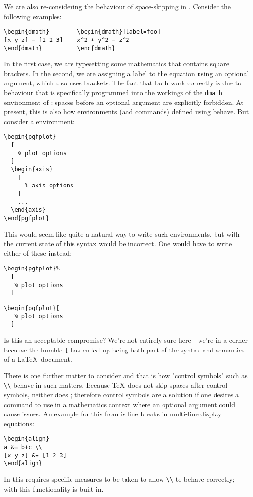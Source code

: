 \documentclass{ltnews}
\begin{document}
We are also re-considering the behaviour of space-skipping in .
Consider the following examples:
\begin{verbatim}
\begin{dmath}        \begin{dmath}[label=foo]
[x y z] = [1 2 3]    x^2 + y^2 = z^2
\end{dmath}          \end{dmath}
\end{verbatim}
In the first case, we are typesetting some mathematics that contains square brackets.
In the second, we are assigning a label to the equation using an optional argument, which also uses  brackets.
The fact that both work correctly is due to behaviour that is specifically programmed into the workings of the \texttt{dmath} environment of : spaces before an optional argument are explicitly forbidden.
At present, this is also how environments (and commands) defined using  behave.
But consider a  environment:
\begin{verbatim}
\begin{pgfplot}
  [
    % plot options
  ]
  \begin{axis}
    [
      % axis options
    ]
    ...
  \end{axis}
\end{pgfplot}
\end{verbatim}
This would seem like quite a natural way to write such environments, but with the current state of  this syntax would be incorrect. One would have to write either of these instead:
\begin{multicols}{2}
\begin{verbatim}
\begin{pgfplot}%
  [
   % plot options
  ]
\end{verbatim}
\begin{verbatim}
\begin{pgfplot}[
   % plot options
  ]
\end{verbatim}
\end{multicols}
Is this an acceptable compromise?
We're not entirely sure here---we're in a corner because the humble \texttt{[} has ended up being both part of the syntax and semantics of a \LaTeX\ document.

There is one further matter to consider and that is how "control symbols" such as \verb"\\" behave in such matters.
Because \TeX\ does not skip spaces after control symbols, neither does ; therefore control symbols are a solution if one desires a command to use in a mathematics context where an optional argument could cause issues.
An example for this from  is line breaks in multi-line display equations:
\begin{verbatim}
\begin{align}
a &= b+c \\
[x y z] &= [1 2 3]
\end{align}
\end{verbatim}
In  this requires specific measures to be taken to allow \verb"\\" to behave correctly; with  this functionality is built in.
\end{document}
